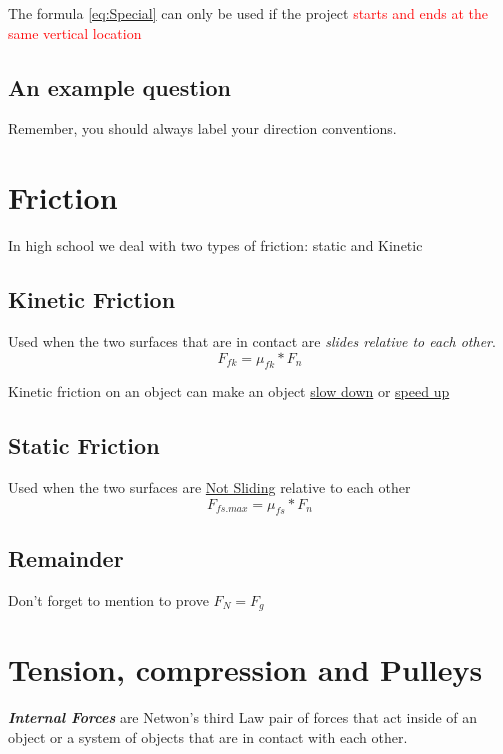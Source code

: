 The formula \ref{eq:Special} can only be used if the project \textcolor{red}{starts and ends at the same vertical location}
\newpage
\subsection{An example question}
Remember, you should always label your direction conventions.


\newpage
\section{Friction}
In high school we deal with two types of friction: static and Kinetic

\subsection{Kinetic Friction}
Used when the two surfaces that are in contact are \textit{slides relative to each other}.
\begin{equation}
    F_{fk} = \mu_{fk} * F_{n}
\end{equation}

Kinetic friction on an object can make an object \underline{slow down} or \underline{speed up}

\subsection{Static Friction}
Used when the two surfaces are \underline{Not Sliding} relative to each other
\begin{equation}
    F_{fs.max} = \mu_{fs} * F_{n}
\end{equation}

\subsection{Remainder}
Don't forget to mention to prove \underline{$F_{N} = F_{g}$}
\newpage
{}

\newpage
\section{Tension, compression and Pulleys}
\textbf{\textit{Internal Forces}} are Netwon's third Law pair of forces that act inside of an object or a system of objects
that are in contact with each other. \\

